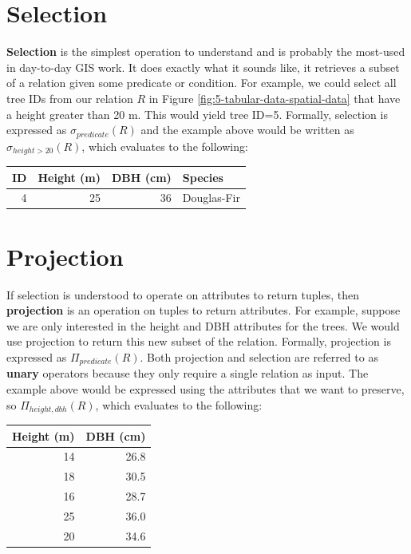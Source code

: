\documentclass[
]{book}
\begin{document}
\hypertarget{selection}{%
\section{Selection}\label{selection}}

\textbf{Selection} is the simplest operation to understand and is probably the most-used in day-to-day GIS work. It does exactly what it sounds like, it retrieves a subset of a relation given some predicate or condition. For example, we could select all tree IDs from our relation \(R\) in Figure \ref{fig:5-tabular-data-spatial-data} that have a height greater than 20 m. This would yield tree ID=5. Formally, selection is expressed as \(σ_{predicate}(R)\) and the example above would be written as \(σ_{height>20}(R)\), which evaluates to the following:

\begin{tabular}{rrrl}
\toprule
ID & Height (m) & DBH (cm) & Species\\
\midrule
4 & 25 & 36 & Douglas-Fir\\
\bottomrule
\end{tabular}

\hypertarget{projection}{%
\section{Projection}\label{projection}}

If selection is understood to operate on attributes to return tuples, then \textbf{projection} is an operation on tuples to return attributes. For example, suppose we are only interested in the height and DBH attributes for the trees. We would use projection to return this new subset of the relation. Formally, projection is expressed as \(Π_{predicate}(R)\). Both projection and selection are referred to as \textbf{unary} operators because they only require a single relation as input. The example above would be expressed using the attributes that we want to preserve, so \(Π_{height,dbh}(R)\), which evaluates to the following:

\begin{tabular}{rr}
\toprule
Height (m) & DBH (cm)\\
\midrule
14 & 26.8\\
18 & 30.5\\
16 & 28.7\\
25 & 36.0\\
20 & 34.6\\
\bottomrule
\end{tabular}
\end{document}
